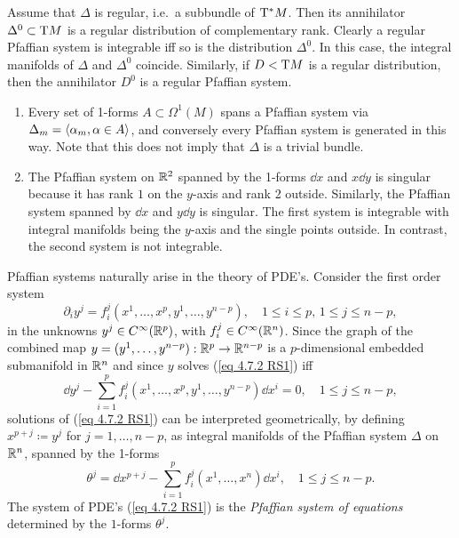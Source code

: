 \begin{rem}
    Assume that $\Delta$ is regular, i.e.~a subbundle of $\mathrm{T}^\ast M$. Then its annihilator $\Delta^0\subset \mathrm{T} M$ is a regular distribution of complementary rank. Clearly a regular Pfaffian system is integrable iff so is the distribution $\Delta^0$. In this case, the integral manifolds of $\Delta$ and $\Delta^0$ coincide. Similarly, if $D< \mathrm{T} M$ is a regular distribution, then the annihilator $D^0$ is a regular Pfaffian system.
\end{rem}

\begin{example}
    \begin{enumerate}
        \item Every set of 1-forms $A\subset \Omega^1(M)$ spans a Pfaffian system via $\Delta_m=\langle\alpha_m,\alpha\in A\rangle$, and conversely every Pfaffian system is generated in this way. Note that this does not imply that $\Delta$ is a trivial bundle.
        \item The Pfaffian system on $\mathbb{R}^2$ spanned by the 1-forms $\dd x$ and $x\dd y$ is singular because it has rank $1$ on the $y$-axis and rank 2 outside. Similarly, the Pfaffian system spanned by $\dd x$ and $y\dd y$ is singular. The first system is integrable with integral manifolds being the $y$-axis and the single points outside. In contrast, the second system is not integrable.
    \end{enumerate}
\end{example}

Pfaffian systems naturally arise in the theory of PDE's. Consider the first order system
\[\partial_i y^j=f_i^j(x^1,\ldots,x^p,y^1,\ldots,y^{n-p}),\quad 1\leq i\leq p,\,1\leq j\leq n-p,\label{eq 4.7.2 RS1}\]
in the unknowns $y^j\in C^\infty(\mathbb{R}^p)$, with $f_i^j\in C^\infty(\mathbb{R}^n)$. Since the graph of the combined map $y=(y^1,\ldots,y^{n-p}):\mathbb{R}^p\to \mathbb{R}^{n-p}$ is a $p$-dimensional embedded submanifold in $\mathbb{R}^n$ and since $y$ solves (\ref{eq 4.7.2 RS1}) iff
\[\dd y^j-\sum_{i=1}^p f_i^j(x^1,\ldots,x^p,y^1,\ldots,y^{n-p})\dd x^i=0,\quad 1\leq j\leq n-p,\]
solutions of (\ref{eq 4.7.2 RS1}) can be interpreted geometrically, by defining $x^{p+j}\coloneqq y^j$ for $j=1,\ldots,n-p$, as integral manifolds of the Pfaffian system $\Delta$ on $\mathbb{R}^n$, spanned by the 1-forms
\[\theta^j=\dd x^{p+j}-\sum_{i=1}^p f_i^j(x^1,\ldots,x^n)\dd x^i,\quad 1\leq j\leq n-p.\]
The system of PDE's (\ref{eq 4.7.2 RS1}) is the \emph{Pfaffian system of equations} determined by the $1$-forms $\theta^j$.

